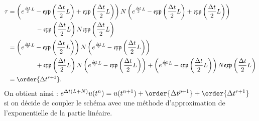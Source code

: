 $$
  \begin{aligned}
    \tau &= \left( e^{\frac{\Delta t}{2}L}-\mathfrak{exp}\left(\frac{\Delta t}{2}L\right)+\mathfrak{exp}\left(\frac{\Delta t}{2}L\right)\right) N \left(e^{\frac{\Delta t}{2}L}-\mathfrak{exp}\left(\frac{\Delta t}{2}L\right)+\mathfrak{exp}\left(\frac{\Delta t}{2}L\right)\right) \\
        & ~~\hphantom{= \big(e^{\frac{\Delta t}{2}L}} - \mathfrak{exp}\left(\frac{\Delta t}{2}L\right)N\mathfrak{exp}\left(\frac{\Delta t}{2}L\right) \\
        &= \left(e^{\frac{\Delta t}{2}L}-\mathfrak{exp}\left(\frac{\Delta t}{2}L\right)\right)N\left(e^{\frac{\Delta t}{2}L}-\mathfrak{exp}\left(\frac{\Delta t}{2}L\right)\right)\\
        & ~~\hphantom{= \big(e^{\frac{\Delta t}{2}L}} + \mathfrak{exp}\left(\frac{\Delta t}{2}L\right)N\left(e^{\frac{\Delta t}{2}L}-\mathfrak{exp}\left(\frac{\Delta t}{2}L\right)\right) + \left(e^{\frac{\Delta t}{2}L}-\mathfrak{exp}\left(\frac{\Delta t}{2}L\right)\right)N\mathfrak{exp}\left(\frac{\Delta t}{2}L\right) \\
        &= \order{\Delta t^{r+1}}.
  \end{aligned}
$$
On obtient ainsi : $e^{\Delta t(L+N)}u(t^n) = u(t^{n+1})+\order{\Delta t^{p+1}}+\order{\Delta t^{r+1}}$ si on décide de coupler le schéma avec une méthode d'approximation de l'exponentielle de la partie linéaire.
